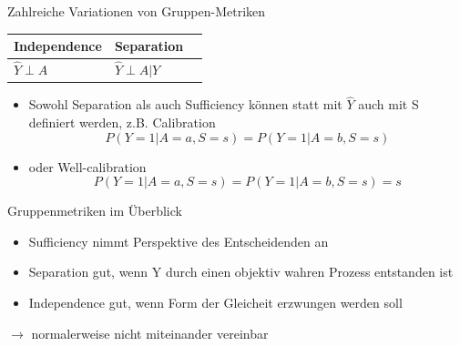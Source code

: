 \documentclass[aspectratio=169]{beamer}
\begin{document}
\begin{frame}[t]{Zahlreiche Variationen von Gruppen-Metriken}
	\vspace*{0.3cm} %
	\begin{table}
		\begin{tabular}{lll}
			\toprule
			Independence & Separation & \color{orange}{Sufficiency} \\
			\midrule
			$\hat{Y} \perp A$ & $\hat{Y} \perp A | Y$ & \color{orange}{$Y \perp A | \hat{Y}$}\\
			\bottomrule
		\end{tabular}
	\end{table}
	\begin{itemize}
		\item Sowohl Separation als auch Sufficiency können statt mit $\hat{Y}$ auch mit S definiert werden, z.B. Calibration 	$$P(Y = 1 | A = a, S = s) = P(Y = 1 | A = b, S = s)$$
		\item oder Well-calibration $$P(Y = 1 | A = a, S = s) = P(Y = 1 | A = b, S = s) = s$$
	\end{itemize}

\end{frame}

\begin{frame}{Gruppenmetriken im Überblick}
	\begin{itemize}
		\item Sufficiency nimmt Perspektive des Entscheidenden an
		\item Separation gut, wenn Y durch einen objektiv wahren Prozess entstanden ist
		\item Independence gut, wenn Form der Gleicheit erzwungen werden soll \cite{castelnovo2022}
	\end{itemize}
	\vspace*{0.5cm}
	\centering
	$\rightarrow$ normalerweise nicht miteinander vereinbar
\end{frame}
\end{document}
